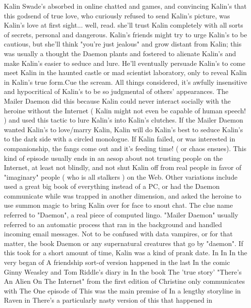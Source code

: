 \documentclass[12pt]{book}
\begin{document}
Kalin Swade's absorbed in online chatted and games, and convincing Kalin's that this godsend of true love, who curiously refused to send Kalin's picture, was Kalin's love at first sight... well, read. she'll trust Kalin completely with all sorts of secrets, personal and dangerous. Kalin's friends might try to urge Kalin's to be cautious, but she'll think "you're just jealous" and grow distant from Kalin; this was usually a thought the Daemon plants and fostered to alienate Kalin's and make Kalin's easier to seduce and lure. He'll eventually persuade Kalin's to come meet Kalin in the haunted castle or mad scientist laboratory, only to reveal Kalin in Kalin's true form.Cue the scream. All things considered, it's awfully insensitive and hypocritical of Kalin's to be so judgmental of others' appearances. The Mailer Daemon did this because Kalin could never interact socially with the heroine without the Internet ( Kalin might not even be capable of human speech! ) and used this tactic to lure Kalin's into Kalin's clutches. If the Mailer Daemon wanted Kalin's to love/marry Kalin, Kalin will do Kalin's best to seduce Kalin's to the dark side with a circled monologue. If Kalin failed, or was interested in companionship, the fangs come out and it's feeding time! ( or chaos ensues). This kind of episode usually ends in an aesop about not trusting people on the Internet, at least not blindly, and not shut Kalin off from real people in favor of "imaginary" people ( who is all stalkers ) on the Web. Other variations include used a great big book of everything instead of a PC, or had the Daemon communicate while was trapped in another dimension, and asked the heroine to use summon magic to bring Kalin over for face to snout chat. The clue name referred to "Daemon", a real piece of computed lingo. "Mailer Daemon" usually referred to an automatic process that ran in the background and handled incoming email messages. Not to be confused with data vampires, or for that matter, the book Daemon or any supernatural creatures that go by "daemon". If this took for a short amount of time, Kalin was a kind of prank date. In In In the very began of A friendship sort-of version happened in the last In the comic Ginny Weasley and Tom Riddle's diary in In the book The 'true story' "There's An Alien On The Internet" from the first edition of Christine only communicates with The One episode of This was the main premise of In a lengthy storyline in Raven in There's a particularly nasty version of this that happened in
\end{document}
